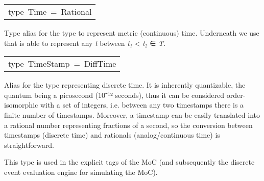 \begin{haddockdesc}
\item[\begin{tabular}{@{}l}
type\ Time\ =\ Rational
\end{tabular}]\haddockbegindoc
Type alias for the type to represent metric (continuous)
 time. Underneath we use  that is able to represent any
 \emph{t} between \emph{t₁} < \emph{t₂} ∈ \emph{T}.\par

\end{haddockdesc}
\begin{haddockdesc}
\item[\begin{tabular}{@{}l}
type\ TimeStamp\ =\ DiffTime
\end{tabular}]\haddockbegindoc
Alias for the type representing discrete time. It is inherently
 quantizable, the quantum being a picosecond (10⁻¹²
 seconds), thus it can be considered order-isomorphic with a set of
 integers, i.e. between any two timestamps there is a finite number
 of timestamps. Moreover, a timestamp can be easily translated into
 a rational number representing fractions of a second, so the
 conversion between timestamps (discrete time) and rationals
 (analog/continuous time) is straightforward.\par
This type is used in the explicit tags of the
  MoC (and subsequently the discrete event
 evaluation engine for simulating the  MoC).\par

\end{haddockdesc}
